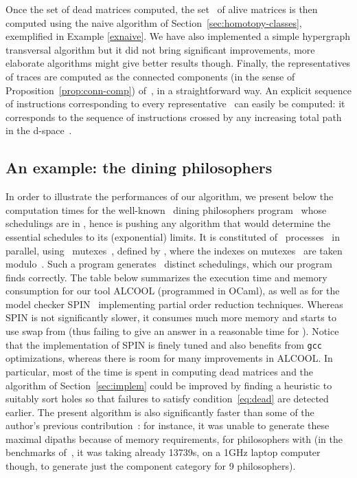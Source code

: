 \documentclass[orivec]{llncs} \usepackage[T1]{fontenc}
\begin{document}
Once the set of dead matrices computed, the set~ of alive matrices is
then computed using the naive algorithm of Section~\ref{sec:homotopy-classes},
exemplified in Example \ref{exnaive}. We have also implemented a simple
hypergraph transversal algorithm \cite{Berge} but it did not bring significant
improvements, more elaborate algorithms might give better results
though. Finally, the representatives of traces are computed as the connected
components (in the sense of Proposition~\ref{prop:conn-comp}) of~, in a
straightforward way. An explicit sequence of instructions corresponding to every
representative~ can easily be computed: it corresponds to the sequence of
instructions crossed by any increasing total path in the d-space~.


\subsection{An example: the  dining philosophers}
\label{benchmarks}
In order to illustrate the performances of our algorithm, we present below the
computation times for the well-known ~dining philosophers
program~\cite{philosophers} whose schedulings are 
in , hence is pushing any algorithm that would determine the essential
schedules to its (exponential) limits.
It is constituted of~
processes~ in parallel, using~ mutexes~, defined by
\hbox{}, where the indexes on
mutexes~ are taken modulo~. Such a program generates~ distinct
schedulings, which our program finds correctly. The table below summarizes the
execution time and memory consumption for our tool \hbox{ALCOOL} (programmed in
OCaml), as well as for the model checker SPIN~\cite{spin} implementing partial
order reduction techniques. Whereas SPIN is not significantly slower, it consumes
much more memory and starts to use swap from  (thus failing to give an
answer in a reasonable time for ). Notice that the implementation of SPIN
is finely tuned and also benefits from \texttt{gcc} optimizations, whereas there
is room for many improvements in ALCOOL. In particular, most of the time is
spent in computing dead matrices and the algorithm of Section~\ref{sec:implem}
could be improved by finding a heuristic to suitably sort holes so that failures
to satisfy condition~\eqref{eq:dead} are detected earlier. The present algorithm
is also significantly faster than some of the author's previous
contribution~\cite{concur05}: for instance, it was unable to generate these
maximal dipaths because of memory requirements, for  philosophers with 
(in the benchmarks of~\cite{concur05}, it was taking already 13739s, on a 1GHz
laptop computer though, to generate just the component category for 9
philosophers).
\end{document}
